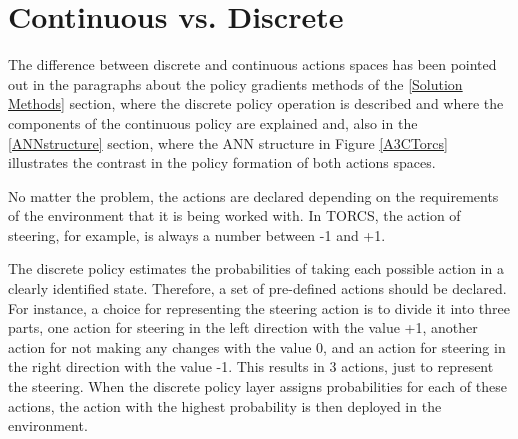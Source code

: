 \section{Continuous vs. Discrete}\label{ContinuousDiscreteActionsSpaces}
The difference between discrete and continuous actions spaces has been pointed out in the paragraphs about the policy gradients methods of the \ref{Solution Methods} section, where the discrete policy operation is described and where the components of the continuous policy are explained and, also in the \ref{ANNstructure} section, where the ANN structure in Figure \ref{A3CTorcs} illustrates the contrast in the policy formation of both actions spaces.

No matter the problem, the actions are declared depending on the requirements of the environment that it is being worked with. In TORCS, the action of steering, for example, is always a number between -1 and +1.

The discrete policy estimates the probabilities of taking each possible action in a clearly identified state. Therefore, a set of pre-defined actions should be declared. For instance, a choice for representing the steering action is to divide it into three parts, one action for steering in the left direction with the value +1, another action for not making any changes with the value 0, and an action for steering in the right direction with the value -1. This results in 3 actions, just to represent the steering. When the discrete policy layer assigns probabilities for each of these actions, the action with the highest probability is then deployed in the environment.

